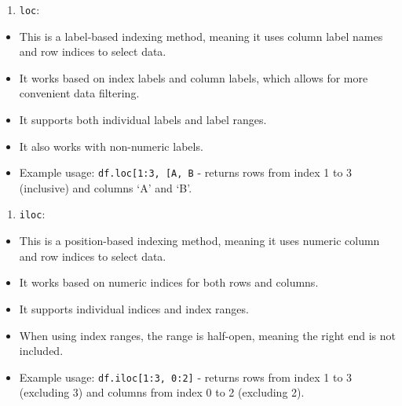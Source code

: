 \documentclass[
  english,
  letterpaper,
  DIV=11,
  numbers=noendperiod]{scrreprt}
\providecommand{\tightlist}{%
  \setlength{\itemsep}{0pt}\setlength{\parskip}{0pt}}
\begin{document}
\begin{enumerate}
\def\labelenumi{\arabic{enumi}.}
\tightlist
\item
  \texttt{loc}:
\end{enumerate}

\begin{itemize}
\tightlist
\item
  This is a label-based indexing method, meaning it uses column label
  names and row indices to select data.
\item
  It works based on index labels and column labels, which allows for
  more convenient data filtering.
\item
  It supports both individual labels and label ranges.
\item
  It also works with non-numeric labels.
\item
  Example usage:
  \texttt{df.loc{[}1:3,\ {[}\textquotesingle{}A\textquotesingle{},\ \textquotesingle{}B\textquotesingle{}{]}{]}}
  - returns rows from index 1 to 3 (inclusive) and columns `A' and `B'.
\end{itemize}

\begin{enumerate}
\def\labelenumi{\arabic{enumi}.}
\setcounter{enumi}{1}
\tightlist
\item
  \texttt{iloc}:
\end{enumerate}

\begin{itemize}
\tightlist
\item
  This is a position-based indexing method, meaning it uses numeric
  column and row indices to select data.
\item
  It works based on numeric indices for both rows and columns.
\item
  It supports individual indices and index ranges.
\item
  When using index ranges, the range is half-open, meaning the right end
  is not included.
\item
  Example usage: \texttt{df.iloc{[}1:3,\ 0:2{]}} - returns rows from
  index 1 to 3 (excluding 3) and columns from index 0 to 2 (excluding
  2).
\end{itemize}
\end{document}
